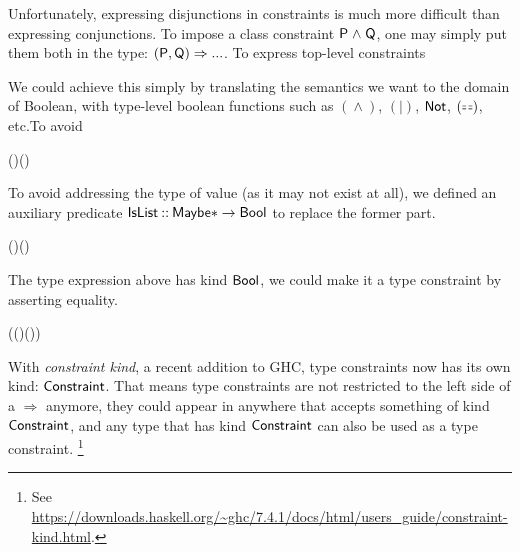 Unfortunately, expressing disjunctions in constraints is much more difficult
than expressing conjunctions. To impose a class constraint \ensuremath{\Conid{P}\mathrel{\wedge}\Conid{Q}}, one may
simply put them both in the type: \ensuremath{(\Conid{P},\Conid{Q})\Rightarrow \mathbin{...}}. To express top-level
constraints


We could achieve this simply by translating the semantics we want to the
 domain of Boolean, with type-level boolean functions such as
\ensuremath{(\mathrel{\wedge})},
\ensuremath{(\mid )}, \ensuremath{\Conid{Not}},
\ensuremath{(\doubleequals)}, etc.\footnotemark To avoid


\begin{hscode}\SaveRestoreHook
{}%
%
\>[B]{}\;\;\doubleequals{}\;(\;)\mathrel{\vee}\;(\;\;){}\<[E]%
\ColumnHook
\end{hscode}\resethooks

To avoid addressing the type of value (as it may not exist at all), we defined
 an auxiliary predicate \ensuremath{\Conid{IsList}\mathbin{::}\Conid{Maybe}\mathbin{*}\to \Conid{Bool}} to
 replace the former part.

\begin{hscode}\SaveRestoreHook
{}%
%
\>[B]{}\;(\;\;)\mathrel{\vee}\;(\;\;){}\<[E]%
\ColumnHook
\end{hscode}\resethooks

The type expression above has kind \ensuremath{\Conid{Bool}}, we could make it
 a type constraint by asserting equality.

\begin{hscode}\SaveRestoreHook
{}%
%
\>[B]{}(\;(\;\;)\mathrel{\vee}\;(\;\;))\mathord{\sim}\<[E]%
\ColumnHook
\end{hscode}\resethooks

With \emph{constraint kind}, a recent addition to GHC, type constraints now has
 its own kind: \ensuremath{\Conid{Constraint}}. That means type constraints
 are not restricted to the left side of a \ensuremath{\Rightarrow } anymore,
 they could appear in anywhere that accepts something of kind
 \ensuremath{\Conid{Constraint}}, and any type that has kind
 \ensuremath{\Conid{Constraint}} can also be used as a type constraint.
 \footnote{See \url{https://downloads.haskell.org/~ghc/7.4.1/docs/html/users_guide/constraint-kind.html}.}

